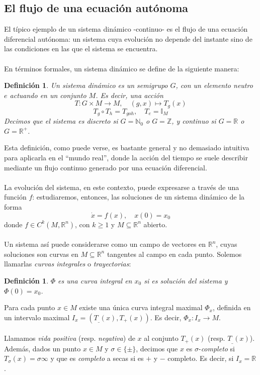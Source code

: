 \documentclass[12pt,a4paper]{article}
\newtheorem{definition}[theorem]{Definición}
\begin{document}
\subsection{El flujo de una ecuación autónoma}
El típico ejemplo de un sistema dinámico -continuo- es el flujo de una ecuación diferencial autónoma: un sistema cuya evolución no depende del instante sino de las condiciones en las que el sistema se encuentra.
\\
\\
En términos formales, un sistema dinámico se define de la siguiente manera:
\begin{definition} Un sistema dinámico es un semigrupo $G$, con un elemento neutro $e$ actuando en un conjunto $M$. Es decir, una acción
\[
T: G \times M \rightarrow M, \quad (g,x) \mapsto T_g(x)
\]
\[
T_g \circ T_h = T_{goh}, \quad T_e = \mathbb{I}_M
\]
Decimos que el sistema es discreto si $G = \mathbb{N}_0$ o $G=\mathbb{Z}$, y continuo si $G = \mathbb{R}$ o $G = \mathbb{R^+}$.
\end{definition}
Esta definición, como puede verse, es bastante general y no demasiado intuitiva para aplicarla en el ``mundo real'', donde la acción del tiempo se suele describir mediante un flujo continuo generado por una ecuación diferencial.
\\
\\
La evolución del sistema, en este contexto, puede expresarse a través de una función $f$: estudiaremos, entonces, las soluciones de un sistema dinámico de la forma
\[
\dot{x} = f(x), \quad x(0) = x_0
\]
donde $f \in C^k(M, \mathbb{R}^n)$, con $k \geq 1$ y $M \subseteq \mathbb{R}^n$ abierto.
\\
\\
Un sistema así puede considerarse como un campo de vectores en $\mathbb{R}^n$, cuyas soluciones son curvas en $M \subseteq \mathbb{R}^n$ tangentes al campo en cada punto. Solemos llamarlas \textit{curvas integrales} o \textit{trayectorias}:
\begin{definition}
    $\Phi$ es una curva integral en $x_0$ si es solución del sistema y $\Phi(0) = x_0$.
\end{definition}
Para cada punto $x \in M$ existe una única curva integral maximal $\Phi_x$, definida en un intervalo maximal $I_x = (T_{\_}(x), T_+(x))$. Es decir, $\Phi_x: I_x \rightarrow M$.
\\
\\
Llamamos \textit{vida positiva} (resp. \textit{negativa}) de $x$ al conjunto $T_+(x)$ (resp. $T_\_(x)$). Además, dados un punto $x \in M$ y $\sigma \in \{\pm\}$, decimos que $x$ es $\sigma$-\textit{completo} si $T_\sigma(x) = \sigma\infty$ y que es \textit{completo} a secas si es $+$ y $-$ completo. Es decir, si $I_x = \mathbb{R}$.
\end{document}
